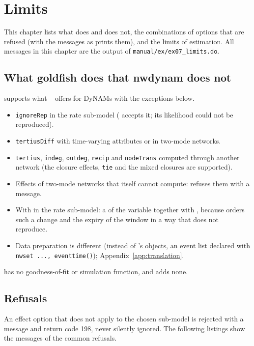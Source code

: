 \chapter{Limits}\label{ch:limits}

This chapter lists what \goldfish{} does and \nwdynam{} does not, the combinations of options that are refused (with the messages as \nwdynam{} prints them), and the limits of estimation. All messages in this chapter are the output of \texttt{manual/ex/ex07\_limits.do}.

\section{What goldfish does that nwdynam does not}

\nwdynam{} supports what \goldfish{}~\gfver{} offers for DyNAMs with the exceptions below.
\begin{itemize}[nosep]
  \item \texttt{ignoreRep} in the rate sub-model (\goldfish{} accepts it; its likelihood could not be reproduced).
  \item \texttt{tertiusDiff} with time-varying attributes or in two-mode networks.
  \item \texttt{tertius}, \texttt{indeg}, \texttt{outdeg}, \texttt{recip} and \texttt{nodeTrans} computed through another network (the closure effects, \texttt{tie} and the mixed closures are supported).
  \item Effects of two-mode networks that \goldfish{} itself cannot compute: \nwdynam{} refuses them with a message.
  \item With  in the rate sub-model: a  of the  variable together with , because \goldfish{} orders such a change and the expiry of the window in a way that \nwdynam{} does not reproduce.
  \item Data preparation is different (instead of \goldfish{}'s objects, an event list declared with \texttt{nwset ..., eventtime()}); Appendix~\ref{app:translation}.
\end{itemize}
\goldfish{} has no goodness-of-fit or simulation function, and \nwdynam{} adds none.

\section{Refusals}\label{sec:refusals}

An effect option that does not apply to the chosen sub-model is rejected with a message and return code 198, never silently ignored. The following listings show the messages of the common refusals.

